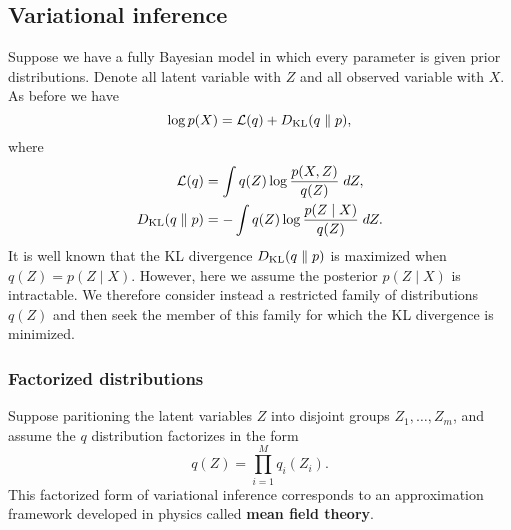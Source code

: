 \documentclass[a4paper]{article}
\begin{document}
\subsection{Variational inference}

Suppose we have a fully Bayesian model in which every parameter
is given prior distributions. Denote all latent variable with
$Z$ and all observed variable with $X$. As before we have
\[
\log p(X) = \mathcal{L}(q) + D_{\text{KL}}(q \; \Vert \; p),
\]
where
\[
\begin{aligned}
  \mathcal{L}(q) &= \int q(Z) \log \frac{p(X, Z)}{q(Z)} \; d Z, \\
  D_{\text{KL}}(q \; \Vert \; p) &= - \int q(Z) \log \frac{p(Z \mid X)}{q(Z)}
  \; d Z.
\end{aligned}
\]
It is well known that the KL divergence $D_{\text{KL}}(q \; \Vert \; p)$ is
maximized when $q(Z) = p(Z \mid X)$. However, here we
assume the posterior $p(Z \mid X)$ is intractable.
We therefore consider instead a restricted family of
distributions $q(Z)$ and then seek the member of this
family for which the KL divergence is minimized.

\subsubsection{Factorized distributions}
Suppose paritioning the latent variables $Z$ into disjoint
groups $Z_1, \dots, Z_m$, and assume the $q$ distribution
factorizes in the form
\[
q(Z) = \prod_{i=1}^M q_i(Z_i).
\]
This factorized form of variational inference corresponds to an
approximation framework developed in physics called \textbf{mean
field theory}.
\end{document}
